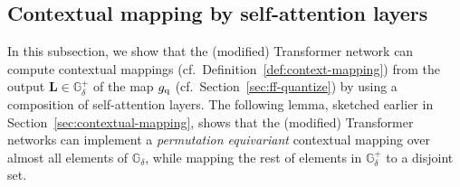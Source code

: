 \documentclass{article} %
\def\vv{{\bm{v}}}
\def\mL{{\bm{L}}}
\def\mX{{\bm{X}}}
\def\sG{{\mathbb{G}}}
\begin{document}
\subsection{Contextual mapping by self-attention layers}
\vspace*{-3pt}
\label{sec:attn-context}
In this subsection, we show that the (modified) Transformer network can compute contextual mappings (cf.~Definition~\ref{def:context-mapping}) from the output $\mL \in \sG^{+}_{\delta}$ of the map $g_{\rm q}$ (cf.~Section~\ref{sec:ff-quantize}) by using a composition of self-attention layers.
The following lemma, sketched earlier in Section~\ref{sec:contextual-mapping}, shows that the (modified) Transformer networks can implement a \emph{permutation equivariant} contextual mapping over almost all elements of $\sG_{\delta}$, while mapping the rest of elements in $\sG^{+}_{\delta}$ to a disjoint set.



\end{document}
